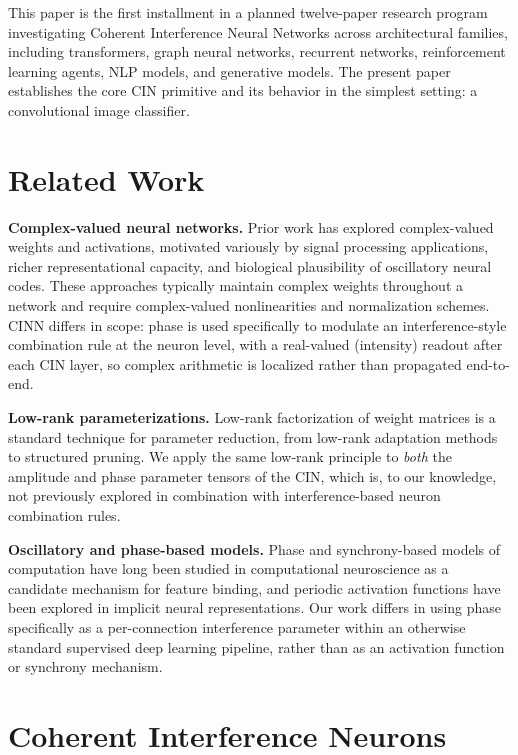 \documentclass[11pt]{article}
\begin{document}
This paper is the first installment in a planned twelve-paper research program investigating Coherent Interference Neural Networks across architectural families, including transformers, graph neural networks, recurrent networks, reinforcement learning agents, NLP models, and generative models. The present paper establishes the core CIN primitive and its behavior in the simplest setting: a convolutional image classifier.

\section{Related Work}
\label{sec:related}

\textbf{Complex-valued neural networks.} Prior work has explored complex-valued weights and activations, motivated variously by signal processing applications, richer representational capacity, and biological plausibility of oscillatory neural codes. These approaches typically maintain complex weights throughout a network and require complex-valued nonlinearities and normalization schemes. CINN differs in scope: phase is used specifically to modulate an interference-style combination rule at the neuron level, with a real-valued (intensity) readout after each CIN layer, so complex arithmetic is localized rather than propagated end-to-end.

\textbf{Low-rank parameterizations.} Low-rank factorization of weight matrices is a standard technique for parameter reduction, from low-rank adaptation methods to structured pruning. We apply the same low-rank principle to \emph{both} the amplitude and phase parameter tensors of the CIN, which is, to our knowledge, not previously explored in combination with interference-based neuron combination rules.

\textbf{Oscillatory and phase-based models.} Phase and synchrony-based models of computation have long been studied in computational neuroscience as a candidate mechanism for feature binding, and periodic activation functions have been explored in implicit neural representations. Our work differs in using phase specifically as a per-connection interference parameter within an otherwise standard supervised deep learning pipeline, rather than as an activation function or synchrony mechanism.

\section{Coherent Interference Neurons}
\label{sec:method}
\end{document}
